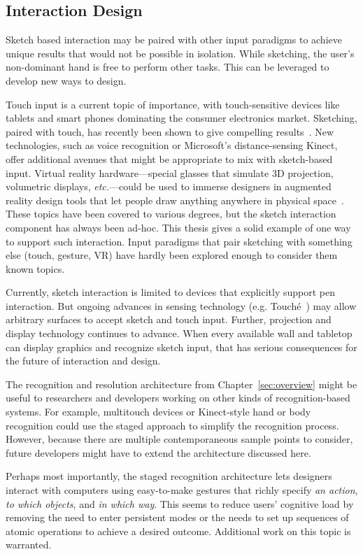 \subsection{Interaction Design}

Sketch based interaction may be paired with other input paradigms to
achieve unique results that would not be possible in isolation. While
sketching, the user's non-dominant hand is free to perform other
tasks. This can be leveraged to develop new ways to design. 

Touch input is a current topic of importance, with touch-sensitive
devices like tablets and smart phones dominating the consumer
electronics market. Sketching, paired with touch, has recently been
shown to give compelling results~\cite{hinckley-pen-touch}. New
technologies, such as voice recognition or Microsoft's
distance-sensing Kinect, offer additional avenues that might be
appropriate to mix with sketch-based input. Virtual reality
hardware---special glasses that simulate 3D projection, volumetric
displays, \textit{etc.}---could be used to immerse designers in
augmented reality design tools that let people draw anything anywhere
in physical space~\cite{jung-lightpen}. These topics have been covered
to various degrees, but the sketch interaction component has always
been ad-hoc. This thesis gives a solid example of one way to support
such interaction. Input paradigms that pair sketching with something
else (touch, gesture, VR) have hardly been explored enough to consider
them known topics. 

Currently, sketch interaction is limited to devices that explicitly
support pen interaction. But ongoing advances in sensing technology
(e.g. Touch\'e~\cite{sato-touche}) may allow arbitrary surfaces to
accept sketch and touch input. Further, projection and display
technology continues to advance. When every available wall and
tabletop can display graphics and recognize sketch input, that has
serious consequences for the future of interaction and design.

The recognition and resolution architecture from
Chapter~\ref{sec:overview} might be useful to researchers and
developers working on other kinds of recognition-based systems. For
example, multitouch devices or Kinect-style hand or body recognition
could use the staged approach to simplify the recognition
process. However, because there are multiple contemporaneous sample
points to consider, future developers might have to extend the
architecture discussed here.

Perhaps most importantly, the staged recognition architecture lets
designers interact with computers using easy-to-make gestures that
richly specify \textit{an action}, \textit{to which objects}, and
\textit{in which way}. This seems to reduce users' cognitive load by
removing the need to enter persistent modes or the needs to set up
sequences of atomic operations to achieve a desired
outcome. Additional work on this topic is warranted.


